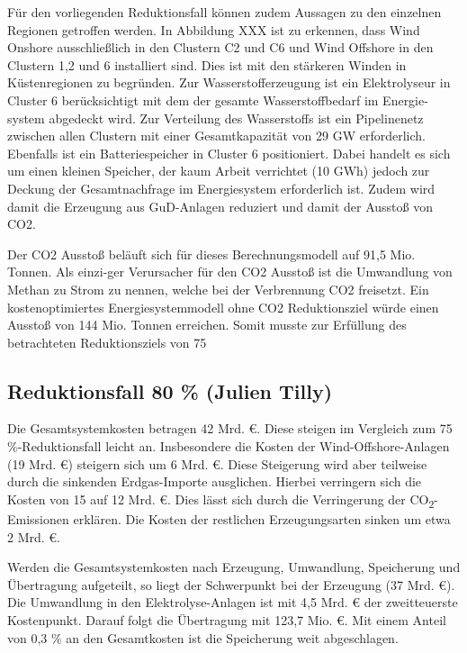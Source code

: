 Für den vorliegenden Reduktionsfall können zudem Aussagen zu den einzelnen Regionen getroffen werden. In Abbildung XXX ist zu erkennen, dass Wind Onshore ausschließlich in den Clustern C2 und C6 und Wind Offshore in den Clustern 1,2 und 6 installiert sind. Dies ist mit den stärkeren Winden in Küstenregionen zu begründen. Zur Wasserstofferzeugung ist ein Elektrolyseur in Cluster 6 berücksichtigt mit dem der gesamte Wasserstoffbedarf im Energie-system abgedeckt wird. Zur Verteilung des Wasserstoffs ist ein Pipelinenetz zwischen allen Clustern mit einer Gesamtkapazität von 29 GW erforderlich. Ebenfalls ist ein Batteriespeicher in Cluster 6 positioniert. Dabei handelt es sich um einen kleinen Speicher, der kaum Arbeit verrichtet (10 GWh) jedoch zur Deckung der Gesamtnachfrage im Energiesystem erforderlich ist. Zudem wird damit die Erzeugung aus GuD-Anlagen reduziert und damit der Ausstoß von CO2. 

Der CO2 Ausstoß beläuft sich für dieses Berechnungsmodell auf 91,5 Mio. Tonnen. Als einzi-ger Verursacher für den CO2 Ausstoß ist die Umwandlung von Methan zu Strom zu nennen, welche bei der Verbrennung CO2 freisetzt. Ein kostenoptimiertes Energiesystemmodell ohne CO2 Reduktionsziel würde einen Ausstoß von 144 Mio. Tonnen erreichen. Somit musste zur Erfüllung des betrachteten Reduktionsziels von 75 %


\newpage
\subsection{Reduktionsfall 80 \% (Julien Tilly)}
Die Gesamtsystemkosten betragen 42 Mrd. €. Diese steigen im Vergleich zum 75 \%-Reduktionsfall leicht an. Insbesondere die Kosten der Wind-Offshore-Anlagen (19 Mrd. €) steigern sich um 6 Mrd. €. Diese Steigerung wird aber teilweise durch die sinkenden Erdgas-Importe ausglichen. Hierbei verringern sich die Kosten von 15 auf 12 Mrd. €. Dies lässt sich durch die Verringerung der CO\textsubscript{2}-Emissionen erklären. Die Kosten der restlichen Erzeugungsarten sinken um etwa 2 Mrd. €.

Werden die Gesamtsystemkosten nach Erzeugung, Umwandlung, Speicherung und Über\-tragung aufgeteilt, so liegt der Schwerpunkt bei der Erzeugung (37 Mrd. €). Die Umwandlung in den Elektrolyse-Anlagen ist mit 4,5 Mrd. € der zweitteuerste Kostenpunkt. Darauf folgt die Übertragung mit 123,7 Mio. €. Mit einem Anteil von 0,3 \% an den Gesamtkosten ist die Speicherung weit abgeschlagen.

